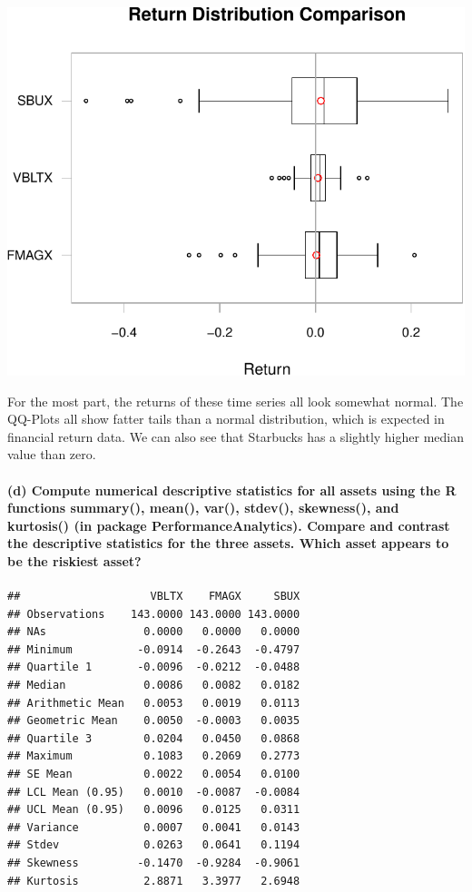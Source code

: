 \documentclass[]{article}
\let\oldparagraph\paragraph
\renewcommand{\paragraph}[1]{\oldparagraph{#1}\mbox{}}
\begin{document}
\includegraphics{homework_4_markdown_files/figure-latex/unnamed-chunk-7-4.pdf}

For the most part, the returns of these time series all look somewhat
normal. The QQ-Plots all show fatter tails than a normal distribution,
which is expected in financial return data. We can also see that
Starbucks has a slightly higher median value than zero.

\paragraph{(d) Compute numerical descriptive statistics for all assets
using the R functions summary(), mean(), var(), stdev(), skewness(), and
kurtosis() (in package PerformanceAnalytics). Compare and contrast the
descriptive statistics for the three assets. Which asset appears to be
the riskiest
asset?}\label{d-compute-numerical-descriptive-statistics-for-all-assets-using-the-r-functions-summary-mean-var-stdev-skewness-and-kurtosis-in-package-performanceanalytics.-compare-and-contrast-the-descriptive-statistics-for-the-three-assets.-which-asset-appears-to-be-the-riskiest-asset}

\begin{verbatim}
##                    VBLTX    FMAGX     SBUX
## Observations    143.0000 143.0000 143.0000
## NAs               0.0000   0.0000   0.0000
## Minimum          -0.0914  -0.2643  -0.4797
## Quartile 1       -0.0096  -0.0212  -0.0488
## Median            0.0086   0.0082   0.0182
## Arithmetic Mean   0.0053   0.0019   0.0113
## Geometric Mean    0.0050  -0.0003   0.0035
## Quartile 3        0.0204   0.0450   0.0868
## Maximum           0.1083   0.2069   0.2773
## SE Mean           0.0022   0.0054   0.0100
## LCL Mean (0.95)   0.0010  -0.0087  -0.0084
## UCL Mean (0.95)   0.0096   0.0125   0.0311
## Variance          0.0007   0.0041   0.0143
## Stdev             0.0263   0.0641   0.1194
## Skewness         -0.1470  -0.9284  -0.9061
## Kurtosis          2.8871   3.3977   2.6948
\end{verbatim}
\end{document}
